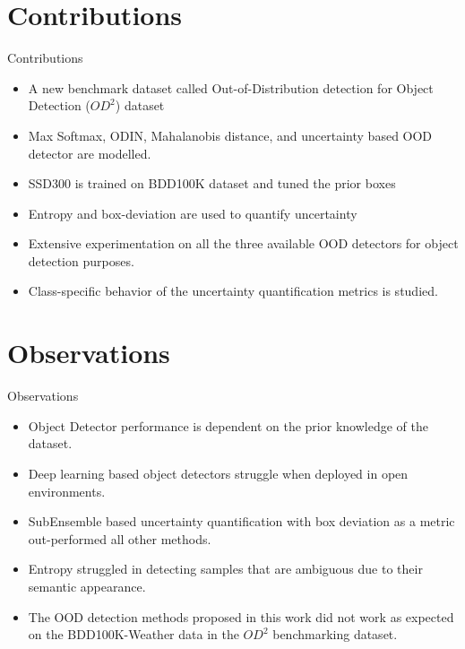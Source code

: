 \documentclass[10pt, aspectratio=169]{beamer}
\begin{document}
\section{Contributions}
\begin{frame}[allowframebreaks]{Contributions}
    \begin{itemize}
        \item A new benchmark dataset called Out-of-Distribution detection for Object Detection ($OD^2$) dataset
        \item Max Softmax, ODIN, Mahalanobis distance, and uncertainty based OOD detector are modelled.
        \item SSD300 is trained on BDD100K dataset and tuned the prior boxes
        \item Entropy and box-deviation are used to quantify uncertainty 
        \item Extensive experimentation on all the three available OOD detectors for object detection purposes. 
        \item Class-specific behavior of the uncertainty quantification metrics is studied.
    \end{itemize}
\end{frame}

\section{Observations}
\begin{frame}[allowframebreaks]{Observations}
    \begin{itemize}
        \item Object Detector performance is dependent on the prior knowledge of the dataset. 
        \item Deep learning based object detectors struggle when deployed in open environments.
        \item SubEnsemble based uncertainty quantification with box deviation as a metric out-performed all other methods.
        \item Entropy struggled in detecting samples that are ambiguous due to their semantic appearance.
        \item The OOD detection methods proposed in this work did not work as expected on the BDD100K-Weather data in the $OD^2$ benchmarking dataset.
    \end{itemize}
\end{frame}
\end{document}
